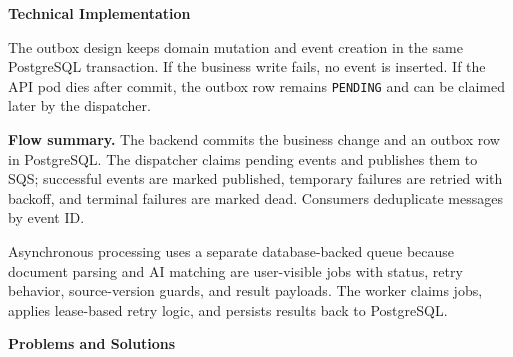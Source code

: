 \vspace{0.5em}\noindent\textbf{Technical Implementation}\par

The outbox design keeps domain mutation and event creation in the same
PostgreSQL transaction. If the business write fails, no event is
inserted. If the API pod dies after commit, the outbox row remains
\texttt{PENDING} and can be claimed later by the dispatcher.

\textbf{Flow summary.} The backend commits the business change and an
outbox row in PostgreSQL. The dispatcher claims pending events and
publishes them to SQS; successful events are marked published, temporary
failures are retried with backoff, and terminal failures are marked
dead. Consumers deduplicate messages by event ID.

Asynchronous processing uses a separate database-backed queue because
document parsing and AI matching are user-visible jobs with status,
retry behavior, source-version guards, and result payloads. The worker
claims jobs, applies lease-based retry logic, and persists results back
to PostgreSQL.

\vspace{0.5em}\noindent\textbf{Problems and Solutions}\par

